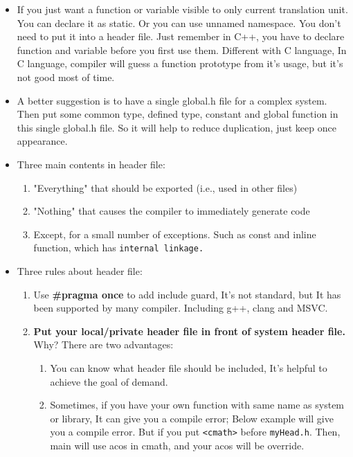 \documentclass[a4paper,11pt,twoside]{book}
\begin{document}
\begin{itemize}
	\item If you just want a function or variable visible to only current translation unit. You can declare it as static. Or you can use unnamed namespace.  You don't need to put it into a header file.  Just remember in C++, you have to declare function and variable before you first use them. Different with C language, In C language, compiler will guess a function prototype from it's usage, but it's not good most of time.
	
	\item A better suggestion is to have a single global.h file for a complex system. Then put some common type, defined type, constant and global function in this single global.h file. So it will help to reduce duplication, just keep once appearance.
	
	\item Three main contents in header file:
	\begin{enumerate}
		\item "Everything" that should be exported (i.e., used in other files)
		
		\item "Nothing" that causes the compiler to immediately generate code
		
		\item Except, for a small number of exceptions. Such as const and inline function, which has \texttt{internal linkage.}
	\end{enumerate}
	
	\item Three rules about header file:
	
	\begin{enumerate}
		\item Use \textbf{\#pragma once} to add include guard, It's not standard, but It has been supported by many compiler. Including g++, clang and MSVC.
		
		\item \textbf{Put your local/private header file in front of system header file. }  Why? There are two advantages:
		\begin{enumerate}
			\item You can know what header file should be included, It's helpful to achieve the goal of demand.
			
			\item Sometimes, if you have your own function with same name as system or library, It can give you a compile error; Below example will give you a compile error. But if you put \texttt{<cmath>} before \texttt{myHead.h}. Then, main will use acos in cmath, and your acos will be override.
		\end{enumerate}
		

\end{enumerate}
\end{itemize}
\end{document}
